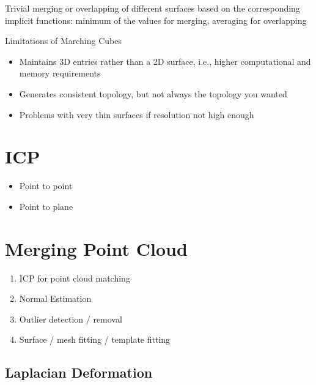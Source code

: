 Trivial merging or overlapping of different surfaces based on the corresponding implicit functions:
minimum of the values for merging, averaging for overlapping

Limitations of Marching Cubes
\begin{itemize}
\item  Maintains 3D entries rather than a 2D surface, i.e., higher computational and memory requirements
\item  Generates consistent topology, but not always the topology you wanted
\item  Problems with very thin surfaces if resolution not high enough
\end{itemize}

\section{ICP}

\begin{itemize}
\item Point to point
\item Point to plane
\end{itemize}

\section{Merging Point Cloud}
\begin{enumerate}
\item ICP for point cloud matching
\item Normal Estimation
\item Outlier detection / removal 
\item Surface / mesh fitting / template fitting
\end{enumerate}

\subsection{Laplacian Deformation}